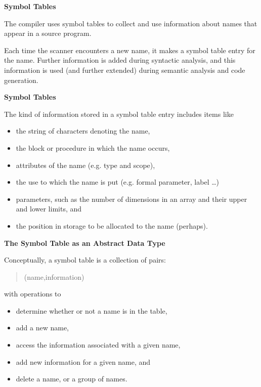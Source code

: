 %
%
\begin{slide}{}
{\bf Symbol Tables}

The compiler uses symbol tables to collect and use information
about names that appear in a source program.

Each time the scanner encounters a new name, it makes a symbol
table entry for the name.  Further information is added during
syntactic analysis, and this information is used (and further
extended) during semantic analysis and code generation.

\end{slide}
%
%
\begin{slide}{}
{\small
{\bf Symbol Tables}

The kind of information stored in a symbol table entry includes items like
\begin{itemize}
\item the string of characters denoting the name,
\item the block or procedure in which the name occurs,
\item attributes of the name (e.g. type and scope),
\item the use to which the name is put (e.g. formal parameter, label \ldots)
\item parameters, such as the number of dimensions in an array and their
      upper and lower limits, and
\item the position in storage to be allocated to the name (perhaps).
\end{itemize}
}

\end{slide}
%
%
\begin{slide}{}
{\small
{\bf The Symbol Table as an Abstract Data Type}

Conceptually, a symbol table is a collection of pairs:
\begin{quote}
    (name,information)
\end{quote}
with operations to
\begin{itemize}
\item determine whether or not a name is in the table,
\item add a new name,
\item access the information associated with a given name,
\item add new information for a given name, and
\item delete a name, or a group of names.
\end{itemize}
}
\end{slide}
